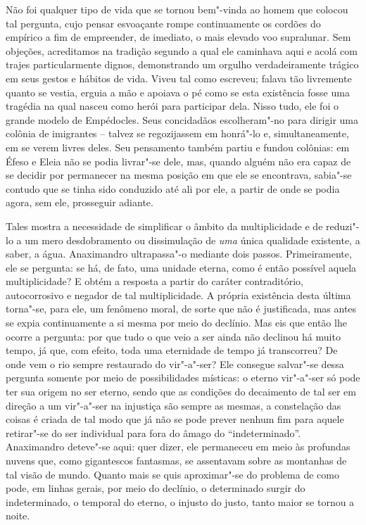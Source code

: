 Não foi qualquer tipo de vida que se tornou bem"-vinda ao homem que 
colocou tal pergunta, cujo pensar esvoaçante rompe continuamente os
cordões do empírico a fim de empreender, de imediato, o mais elevado voo
supralunar. Sem objeções, acreditamos na tradição segundo a qual ele \label{acreditamosnatradicao}
caminhava aqui e acolá com trajes particularmente dignos, demonstrando
um orgulho verdadeiramente trágico em seus gestos e hábitos de vida.
Viveu tal como escreveu; falava tão livremente quanto se vestia, erguia
a mão e apoiava o pé como se esta existência fosse uma tragédia na qual
nasceu como herói para participar dela. Nisso tudo, ele
foi o grande modelo de Empédocles. Seus concidadãos escolheram"-no para
dirigir uma colônia de imigrantes -- talvez se regozijassem em honrá"-lo
e, simultaneamente, em se verem livres deles. Seu pensamento também partiu
e fundou colônias: em Éfeso e Eleia não se podia livrar"-se dele, mas, 
quando alguém não era capaz de se decidir por permanecer na mesma
posição em que ele se encontrava, sabia"-se contudo que se tinha 
sido conduzido até ali por ele, a partir de onde se podia agora, 
sem ele, prosseguir adiante.

Tales mostra a necessidade de simplificar o âmbito da multiplicidade e
de reduzi"-lo a um mero desdobramento ou dissimulação de \textit{uma}
única qualidade existente, a saber, a água. Anaximandro ultrapassa"-o
mediante dois passos. Primeiramente, ele se pergunta: se há, de fato,
uma unidade eterna, como é então possível aquela multiplicidade? E
obtém a resposta a partir do caráter contraditório, autocorrosivo e
negador de tal multiplicidade. A própria existência desta última
torna"-se, para ele, um fenômeno moral, de sorte que não é justificada,
mas antes se expia continuamente a si mesma por meio do declínio. Mas
eis que então lhe ocorre a pergunta: por que tudo o que veio a ser
ainda não declinou há muito tempo, já que, com efeito, toda uma
eternidade de tempo já transcorreu? De onde vem o rio sempre restaurado
do vir"-a"-ser? Ele consegue salvar"-se dessa pergunta somente por meio de
possibilidades místicas: o eterno vir"-a"-ser só pode ter sua origem no
ser eterno, sendo que as condições do decaimento de tal ser em direção
a um vir"-a"-ser na injustiça são sempre as mesmas, a constelação das
coisas é criada de tal modo que já não se pode prever nenhum fim para
aquele retirar"-se do ser individual para fora do âmago do
``indeterminado''. Anaximandro deteve"-se aqui: quer dizer, ele permaneceu
em meio às profundas nuvens que, como gigantescos fantasmas, se
assentavam sobre as montanhas de tal visão de mundo. Quanto mais se
quis aproximar"-se do problema de como pode, em linhas gerais, por meio
do declínio, o determinado surgir do indeterminado, o temporal do
eterno, o injusto do justo, tanto maior se tornou a noite.

